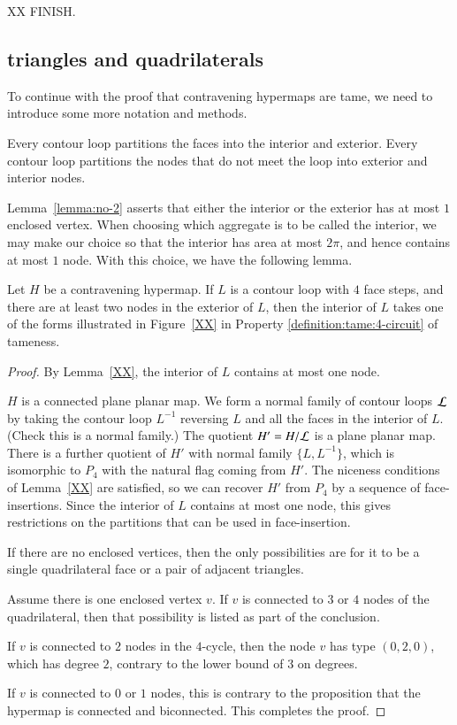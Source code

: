 XX FINISH.


\subsection{triangles and quadrilaterals}


\label{sec:2.2}  To continue with the proof that
contravening hypermaps are tame, we need to introduce some more
notation and methods.



Every contour loop partitions the faces into the interior and
exterior.  Every contour loop partitions the nodes that do not meet
the loop into exterior and interior nodes.
%

Lemma~\ref{lemma:no-2} asserts that either the interior or the
exterior has at most $1$ enclosed vertex.   When choosing which
aggregate is to be called the interior, we may make our choice so
that the interior has area at most $2\pi$, and hence contains at
most $1$ node. With this choice, we have the following lemma.

\begin{lemma}
Let $H$ be a contravening hypermap. If
$L$ is a contour loop with $4$ face steps, and there are at least
two nodes in the exterior of $L$, then the interior of $L$ takes one
of the forms illustrated in Figure~\ref{XX} in Property
    \ref{definition:tame:4-circuit} of tameness.
\end{lemma}

\begin{proof}
By Lemma~\ref{XX}, the interior of $L$ contains at most one node.

$H$ is a connected plane planar map.  We form a normal family of
contour loops ${\cal L}$ by taking the contour loop $L^{-1}$
reversing $L$ and all the faces in the interior of $L$.
(Check this is a normal family.)  The quotient $H' = H/{\cal L}$ is
a plane planar map.  There is a further quotient of $H'$ with normal
family $\{L,L^{-1}\}$, which is isomorphic to $P_4$ with the natural
flag coming from $H'$.  The niceness conditions of Lemma~\ref{XX} are
satisfied, so we can recover $H'$ from $P_4$ by a sequence of
face-insertions.  Since the interior of $L$ contains at most one
node, this gives restrictions on the partitions that can be used in
face-insertion.

If there are no enclosed vertices, then the only possibilities are
for it to be a single quadrilateral face or a pair of adjacent
triangles.

Assume there is one enclosed vertex $v$.  If $v$ is connected to $3$
or $4$ nodes of the quadrilateral, then that possibility is listed
as part of the conclusion.

If $v$ is connected to $2$ nodes in the $4$-cycle, then the
node $v$ has type $(0,2,0)$, which has degree $2$, contrary to the lower bound of $3$ on degrees.

If $v$ is connected to $0$ or $1$ nodes, this is contrary to the proposition that the hypermap is connected and biconnected.  This completes the proof.
\end{proof}


